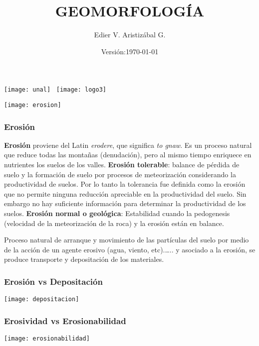 \documentclass{beamer}
\title[Ambiente Denudacional: Erosión]{GEOMORFOLOGÍA}
\author[Edier Aristizabal]{Edier V. Aristizábal G.}
\institute{evaristizabalg@unal.edu.co}
\date{\tiny{Versión:\today}}
\begin{document}
\begin{frame}
\titlepage
\centering
	\texttt{[image: unal]}\hspace*{4.75cm}~%
   	\texttt{[image: logo3]} 
\end{frame}
\begin{frame}
\begin{center}
\texttt{[image: erosion]}
\end{center}
\end{frame}
\begin{frame}
\frametitle{Erosión}
\normalem
\justifying
\small{
\textbf{Erosión} proviene del Latin \emph{erodere}, que significa \emph{to gnaw}. Es un proceso natural que reduce todas las montañas (denudación), pero al mismo tiempo enriquece en nutrientes los suelos de los valles. 
\vfill
\textbf{Erosión tolerable}: balance de pérdida de suelo y la formación de suelo por procesos de meteorización considerando la productividad de suelos. Por lo tanto la tolerancia fue definida como la erosión que no permite ninguna reducción apreciable en la productividad del suelo. Sin embargo no hay suficiente información para determinar la productividad de los suelos. 
\vfill
\textbf{Erosión normal o geológica}: Estabilidad cuando la pedogenesis (velocidad de la meteorización de la roca) y la erosión están en balance. 
\vfill
\begin{center}
Proceso natural de arranque y movimiento de las partículas del suelo por medio de la acción de un agente erosivo (agua, viento, etc).….. y asociado a la erosión, se produce transporte y depositación de los materiales.
\end{center}
}
\end{frame}
\begin{frame}
\frametitle{Erosión vs Depositación}
\begin{center}
\texttt{[image: depositacion]}
\end{center}
\end{frame}
\begin{frame}
\frametitle{Erosividad vs Erosionabilidad}
\begin{center}
\texttt{[image: erosionabilidad]}
\end{center}
\end{frame}
\end{document}
